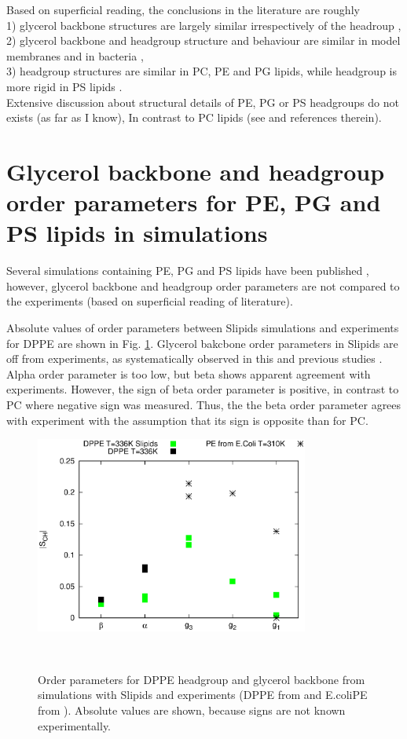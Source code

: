 \documentclass[aps,prl,superscriptaddress,twocolumn]{revtex4}
\begin{document}
Based on superficial reading, the conclusions in the literature are roughly \\ 
1) glycerol backbone structures are largely similar irrespectively of the headroup \cite{gally81}, \\
2) glycerol backbone and headgroup structure and behaviour are similar in model membranes and in bacteria \cite{gally81,scherer87,seelig90}, \\
3) headgroup structures are similar in PC, PE and PG lipids, while headgroup is more rigid in PS lipids \cite{wohlgemuth80,buldt81}. \\
Extensive discussion about structural details of PE, PG or PS headgroups do not exists (as far as I know), 
In contrast to PC lipids (see \cite{botan15} and references therein).


\section{Glycerol backbone and headgroup order parameters for PE, PG and PS lipids in simulations}

Several simulations containing PE, PG and PS lipids have been published \cite{??}, 
however, glycerol backbone and headgroup order parameters are not compared to
the experiments (based on superficial reading of literature).

Absolute values of order parameters between Slipids simulations \cite{??}
and experiments for DPPE are shown in Fig. \ref{HGorderParametersPE}.
Glycerol bakcbone order parameters in Slipids are off from experiments,
as systematically observed in this and previous studies \cite{??}.
Alpha order parameter is too low, but beta shows apparent agreement
with experiments. However, the sign of beta order parameter is positive,
in contrast to PC where negative sign was measured. Thus, the the beta order
parameter agrees with experiment with the assumption that its sign is opposite
than for PC.
\begin{figure}[]
  \centering
  \includegraphics[width=9.0cm]{../Figs/HGorderparametersPE.eps}
  \caption{\label{HGorderParametersPE}
    Order parameters for DPPE headgroup and glycerol
    backbone from simulations with Slipids \cite{??} and experiments
    (DPPE from \cite{seelig76} and E.coliPE from \cite{gally81}).
    Absolute values are shown, because signs are not known experimentally.
  }
   \\
\end{figure}
\end{document}
